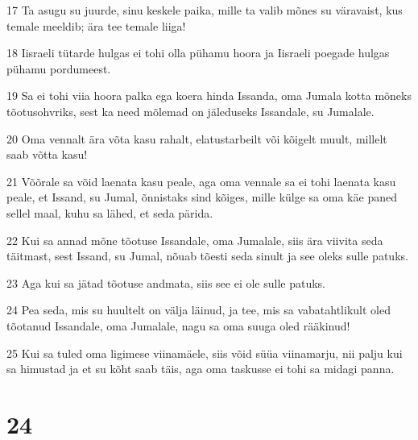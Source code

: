 \par 17 Ta asugu su juurde, sinu keskele paika, mille ta valib mõnes su väravaist, kus temale meeldib; ära tee temale liiga!
\par 18 Iisraeli tütarde hulgas ei tohi olla pühamu hoora ja Iisraeli poegade hulgas pühamu pordumeest.
\par 19 Sa ei tohi viia hoora palka ega koera hinda Issanda, oma Jumala kotta mõneks tõotusohvriks, sest ka need mõlemad on jäleduseks Issandale, su Jumalale.
\par 20 Oma vennalt ära võta kasu rahalt, elatustarbeilt või kõigelt muult, millelt saab võtta kasu!
\par 21 Võõrale sa võid laenata kasu peale, aga oma vennale sa ei tohi laenata kasu peale, et Issand, su Jumal, õnnistaks sind kõiges, mille külge sa oma käe paned sellel maal, kuhu sa lähed, et seda pärida.
\par 22 Kui sa annad mõne tõotuse Issandale, oma Jumalale, siis ära viivita seda täitmast, sest Issand, su Jumal, nõuab tõesti seda sinult ja see oleks sulle patuks.
\par 23 Aga kui sa jätad tõotuse andmata, siis see ei ole sulle patuks.
\par 24 Pea seda, mis su huultelt on välja läinud, ja tee, mis sa vabatahtlikult oled tõotanud Issandale, oma Jumalale, nagu sa oma suuga oled rääkinud!
\par 25 Kui sa tuled oma ligimese viinamäele, siis võid süüa viinamarju, nii palju kui sa himustad ja et su kõht saab täis, aga oma taskusse ei tohi sa midagi panna.

\chapter{24}

